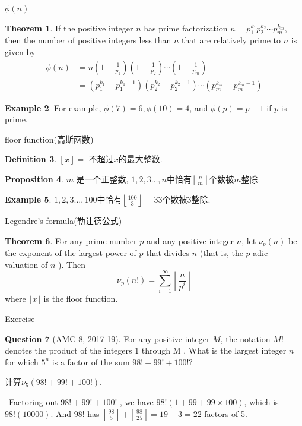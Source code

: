 \documentclass{beamer}
\theoremstyle{definition}
\newtheorem{defn}{Definition}[section]
\newtheorem{theo}[defn]{Theorem}
\newtheorem{prop}[defn]{Proposition}
\newtheorem{exam}[defn]{Example}
\newtheorem{ques}[defn]{Question}
\newenvironment{prooff}{{\noindent\it\textcolor{cyan!40!black}{Proof}:}\,}{\par}
\begin{document}
\begin{frame}{$\phi(n)$}
\begin{theo}
If the positive integer $n$ has prime factorization $n=p_1^{k_1} p_2^{k_2} \cdots p_m^{k_m}$, then the number of positive integers less than $n$ that are relatively prime to $n$ is given by
$$
\begin{aligned}
\phi(n) & =n\left(1-\frac{1}{p_1}\right)\left(1-\frac{1}{p_2}\right) \cdots\left(1-\frac{1}{p_m}\right) \\
& =\left(p_1^{k_1}-p_1^{k_1-1}\right)\left(p_2^{k_2}-p_2^{k_2-1}\right) \cdots\left(p_m^{k_m}-p_m^{k_m-1}\right)
\end{aligned}
$$
\end{theo}
\begin{exam}
For example, $\phi(7)=6, \phi(10)=4$, and $\phi(p)=p-1$ if $p$ is prime.
\end{exam}
\end{frame}
\begin{frame}{floor function(高斯函数)}
\begin{defn} 
$\left\lfloor x\right\rfloor=$ 不超过$x$的最大整数.
\end{defn}
\begin{prop}
    $m$ 是一个正整数, $1,2,3\dots,n$中恰有$\left\lfloor \frac{n}{m}\right\rfloor$个数被$m$整除.
\end{prop}
\begin{exam}
    $1,2,3\dots,100$中恰有$\left\lfloor \frac{100}{3}\right\rfloor=33$个数被$3$整除.
\end{exam}
\end{frame}
\begin{frame}{Legendre's formula(勒让德公式)}
    \begin{theo}
        For any prime number $p$ and any positive integer $n$, let $\nu_p(n)$ be the exponent of the largest power of $p$ that divides $n$ (that is, the $p$-adic valuation of $n$ ). Then
        $$
        \nu_p(n!)=\sum_{i=1}^{\infty}\left\lfloor\frac{n}{p^i}\right\rfloor
        $$
        where $\lfloor x\rfloor$ is the floor function.
    \end{theo}
\end{frame}
\begin{frame}{Exercise}
    \begin{ques}[AMC 8, 2017-19]
        For any positive integer $M$, the notation $M!$ denotes the product of the integers 
        1 through M . What is the largest integer $n$ for which $5^n$ is a factor of the sum $98!+99!+100!?$
    
        计算$\nu_5(98!+99!+100!)$.
    \end{ques}
    \pause 
    \begin{prooff} 
        Factoring out $98!+99!+100!$ ,
        we have $98!(1+99+99\times 100)$, which is $98!(10000)$. 
        And $98!$ has $\left\lfloor\frac{98}{5}\right\rfloor+\left\lfloor\frac{98}{25}\right\rfloor=19+3=22$ 
        factors of 5. 
    \end{prooff}
\end{frame}
\end{document}
